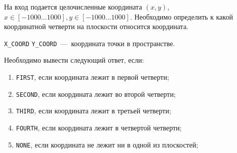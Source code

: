 На вход подается целочисленные координата $(x, y)$, $x \in \left[-1000 \ldots 1000 \right], y \in \left[-1000 \ldots 1000 \right]$.
Необходимо определить к какой координатной четверти на плоскости относится координата.

\InputFile

\texttt{X\_COORD} \texttt{Y\_COORD}~---~координата точки в пространстве.

\OutputFile

Необходимо вывести следующий ответ, если:

\begin{enumerate}
	\item \texttt{FIRST}, если координата лежит в первой четверти;
	\item \texttt{SECOND}, если координата лежит во второй четверти;
	\item \texttt{THIRD}, если координата лежит в третьей четверти;
	\item \texttt{FOURTH}, если координата лежит в четвертой четверти;
	\item \texttt{NONE}, если координата не лежит ни в одной из плоскостей;
\end{enumerate}

\SAMPLES